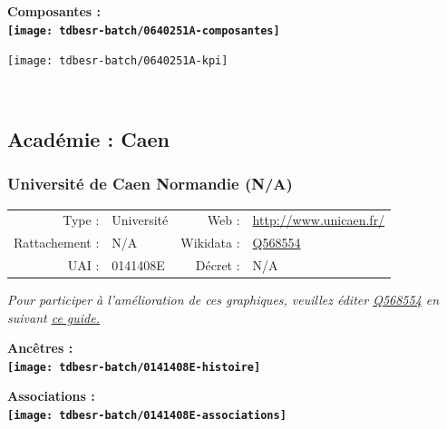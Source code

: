 \documentclass[12pt,french,]{article}
\begin{document}
\begin{center} \bf Composantes : \\  
\texttt{[image: tdbesr-batch/0640251A-composantes]} \end{center}

\begin{center}\texttt{[image: tdbesr-batch/0640251A-kpi]} \end{center}\checkoddpage

\ifoddpage \fi ~\newpage  

\hypertarget{acaduxe9mie-caen}{%
\subsection{Académie : Caen}\label{acaduxe9mie-caen}}

\hypertarget{universituxe9-de-caen-normandie-na}{%
\subsubsection{Université de Caen Normandie
(N/A)}\label{universituxe9-de-caen-normandie-na}}

\begin{tabular*}{\textwidth}{rp{5cm}rl}  
\hline  
Type : & Université & Web : &\href{http://www.unicaen.fr/}{http://www.unicaen.fr/} \\  
Rattachement : & N/A & Wikidata : & \href{https://www.wikidata.org/entity/Q568554}{Q568554} \\  
UAI : & 0141408E & Décret : & N/A \\  
\hline  
\end{tabular*}

\textit{\scriptsize Pour participer à l'amélioration de ces graphiques, veuillez éditer  \href{https://www.wikidata.org/entity/Q568554}{Q568554}  en suivant \href{https://github.com/cpesr/wikidataESR/blob/master/Rmd/wikidataESR.md}{ce guide.}}

\vspace{1cm}  
\begin{minipage}[b]{0.50\textwidth}\begin{center} \bf Ancêtres : \\  
\texttt{[image: tdbesr-batch/0141408E-histoire]} \end{center}\end{minipage}\begin{minipage}[b]{0.50\textwidth}\begin{center} \bf Associations : \\  
\texttt{[image: tdbesr-batch/0141408E-associations]} \end{center}\end{minipage}
\end{document}
